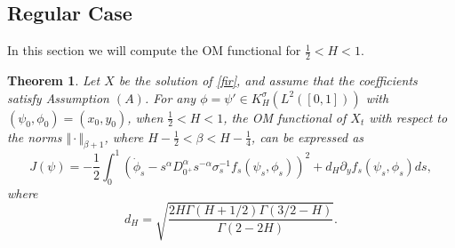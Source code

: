 \documentclass{article}
\newtheorem{theorem}{Theorem}[section]
\theoremstyle{definition}  %
\theoremstyle{plain}  %
\begin{document}
    \subsection{Regular Case }
In this section we will compute the OM functional for $ \frac{1}{2}<H<1.$
\begin{theorem} \label{result2}  Let $X$ be the solution of \eqref{fir}, and assume that the coefficients satisfy Assumption \((A)\).
For any $\phi=\psi' \in K_H^\sigma(L^2([0,1]))$ with $(\psi_0,\phi_0) =(x_0,y_0)$, when $ \tfrac{1}{2} < H < 1$, 
the OM functional of $X_t$ with respect to the norms 
$\Vert \cdot \Vert_{\beta+1}$, where $H-\tfrac{1}{2}<\beta<H-\tfrac{1}{4}$, 
 can be expressed as 
	\begin{equation*}
	J(\psi)=-\frac{1}{2} \int_0^1 \left(\dot{\phi}_s-s^{\alpha}D_{0^+}^\alpha s^{-\alpha}  \sigma_s^{-1} f_s\left(\psi_s,\phi_s\right)\right)^2+d_H \partial_yf_s(\psi_s,\phi_s)ds,
\end{equation*}
where
\begin{equation*}
    d_H= \sqrt{\frac{2H\Gamma(H+1/2)\Gamma(3/2-H)}{\Gamma(2-2H)}}.
\end{equation*}

\end{theorem}
\end{document}
